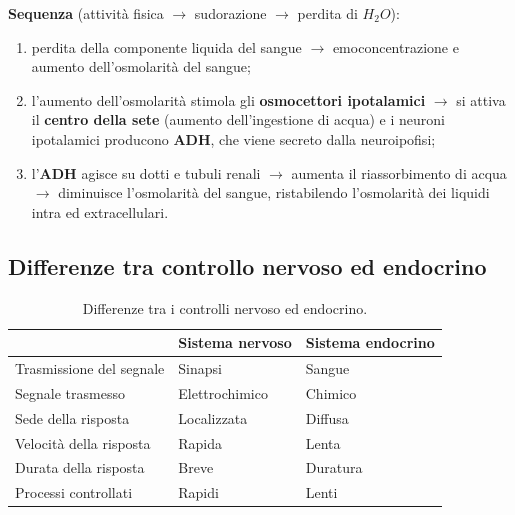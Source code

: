 \textbf{Sequenza} (attività fisica $\rightarrow$ sudorazione $\rightarrow$ perdita di $H_2O$):
\begin{enumerate}
  \item perdita della componente liquida del sangue $\rightarrow$ emoconcentrazione e aumento
    dell'osmolarità del sangue;
  \item l'aumento dell'osmolarità stimola gli \textbf{osmocettori ipotalamici} $\rightarrow$ si
    attiva il \textbf{centro della sete} (aumento dell'ingestione di acqua) e i neuroni ipotalamici
    producono \textbf{ADH}, che viene secreto dalla neuroipofisi;
  \item l'\textbf{ADH} agisce su dotti e tubuli renali $\rightarrow$ aumenta il riassorbimento di
    acqua $\rightarrow$ diminuisce l'osmolarità del sangue, ristabilendo l'osmolarità dei liquidi
    intra ed extracellulari.
\end{enumerate}

\subsection{Differenze tra controllo nervoso ed endocrino}

\begin{table}[htbp]
  \centering
  \small
  \renewcommand{\arraystretch}{1.3}
  \begin{tabularx}{\textwidth}{|l|X|X|}
    \hline
    & \textbf{Sistema nervoso} & \textbf{Sistema endocrino} \\
    \hline
    Trasmissione del segnale & Sinapsi & Sangue \\
    \hline
    Segnale trasmesso & Elettrochimico & Chimico \\
    \hline
    Sede della risposta & Localizzata & Diffusa \\
    \hline
    Velocità della risposta & Rapida & Lenta \\
    \hline
    Durata della risposta & Breve & Duratura \\
    \hline
    Processi controllati & Rapidi & Lenti \\
    \hline
  \end{tabularx}
  \caption{Differenze tra i controlli nervoso ed endocrino.}
  \label{tab:nervoso-endocrino}
\end{table}
